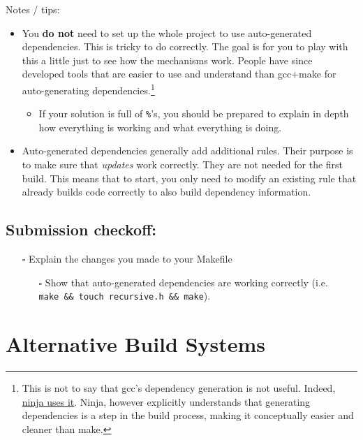 \documentclass{article}
\begin{document}
Notes / tips:
\begin{itemize}
  \item You \textbf{do not} need to set up the whole project to use
    auto-generated dependencies. This is tricky to do correctly.
    The goal is for you to play with this a little just to see how the
    mechanisms work. People have since developed tools that are easier to use
    and understand than gcc+make for auto-generating dependencies.\footnote{
      This is not to say that gcc's dependency generation is not useful.
      Indeed, \href{https://ninja-build.org/manual.html\#ref_headers}{ninja
        uses it}. Ninja, however explicitly understands that generating
      dependencies is a step in the build process, making it conceptually
      easier and cleaner than make.
    }
    \begin{itemize}
      \item If your solution is full of \texttt{\%}'s, you should be prepared
        to explain in depth how everything is working and what everything is
        doing.
    \end{itemize}
  \item Auto-generated dependencies generally add additional rules. Their
    purpose is to make sure that \emph{updates} work correctly. They are not
    needed for the first build. This means that to start, you only need to
    modify an existing rule that already builds code correctly to also build
    dependency information.
\end{itemize}

\subsection*{Submission checkoff:}
\begin{itemize}
  \item[$\square$] Explain the changes you made to your Makefile
    \begin{itemize}
      \item[$\square$] Show that auto-generated dependencies are working
        correctly (i.e. \texttt{make~\&\&~touch~recursive.h~\&\&~make}).
    \end{itemize}
\end{itemize}


\newpage
\section{Alternative Build Systems}
\end{document}
